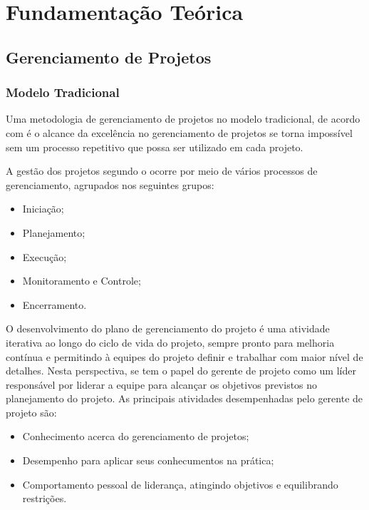 \chapter[Fundamentação Teórica]{Fundamentação Teórica}
\label{cp:fundamentacao}

\section{Gerenciamento de Projetos}

\subsection{Modelo Tradicional}

Uma metodologia de gerenciamento de projetos no modelo tradicional, de acordo com \cite{kerzner} é o alcance da excelência no gerenciamento de projetos se torna impossível sem um processo repetitivo que possa ser utilizado em cada projeto.

A gestão dos projetos segundo o \cite{pmbok}ocorre por meio de vários processos de gerenciamento, agrupados nos seguintes grupos:

\begin{itemize}
    \item Iniciação;
    \item Planejamento;
    \item Execução;
    \item Monitoramento e Controle;
    \item Encerramento.
\end{itemize}

O desenvolvimento do plano de gerenciamento do projeto é uma atividade iterativa ao longo do ciclo de vida do projeto, sempre pronto para melhoria contínua e permitindo à equipes do projeto definir e trabalhar com maior nível de detalhes. Nesta perspectiva, se tem o papel do gerente de projeto como um líder responsável por liderar a equipe para alcançar os objetivos previstos no planejamento do projeto. As principais atividades desempenhadas pelo gerente de projeto são: 

\begin{itemize}
    \item Conhecimento acerca do gerenciamento de projetos;
    \item Desempenho para aplicar seus conhecumentos na prática;
    \item Comportamento pessoal de liderança, atingindo objetivos e equilibrando restrições.
\end{itemize}

